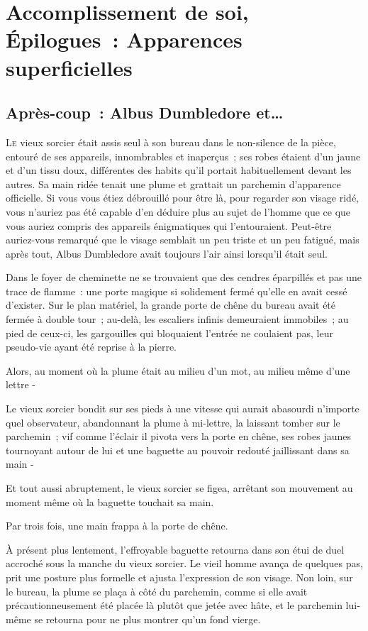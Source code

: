 \chapter{Accomplissement de soi, Épilogues~: Apparences superficielles}

\section{Après-coup~: Albus Dumbledore et…}

\lettrine{L}{e} vieux sorcier était assis seul à son bureau dans le non-silence de la pièce, entouré de ses appareils, innombrables et inaperçus~; ses robes étaient d'un jaune et d'un tissu doux, différentes des habits qu'il portait habituellement devant les autres. Sa main ridée tenait une plume et grattait un parchemin d'apparence officielle. Si vous vous étiez débrouillé pour être là, pour regarder son visage ridé, vous n'auriez pas été capable d'en déduire plus au sujet de l'homme que ce que vous auriez compris des appareils énigmatiques qui l'entouraient. Peut-être auriez-vous remarqué que le visage semblait un peu triste et un peu fatigué, mais après tout, Albus Dumbledore avait toujours l'air ainsi lorsqu'il était seul.

Dans le foyer de cheminette ne se trouvaient que des cendres éparpillés et pas une trace de flamme~: une porte magique si solidement fermé qu'elle en avait cessé d'exister. Sur le plan matériel, la grande porte de chêne du bureau avait été fermée à double tour~; au-delà, les escaliers infinis demeuraient immobiles~; au pied de ceux-ci, les gargouilles qui bloquaient l'entrée ne coulaient pas, leur pseudo-vie ayant été reprise à la pierre.

Alors, au moment où la plume était au milieu d'un mot, au milieu même d'une lettre -

Le vieux sorcier bondit sur ses pieds à une vitesse qui aurait abasourdi n'importe quel observateur, abandonnant la plume à mi-lettre, la laissant tomber sur le parchemin~; vif comme l'éclair il pivota vers la porte en chêne, ses robes jaunes tournoyant autour de lui et une baguette au pouvoir redouté jaillissant dans sa main -

Et tout aussi abruptement, le vieux sorcier se figea, arrêtant son mouvement au moment même où la baguette touchait sa main.

Par trois fois, une main frappa à la porte de chêne.

À présent plus lentement, l'effroyable baguette retourna dans son étui de duel accroché sous la manche du vieux sorcier. Le vieil homme avança de quelques pas, prit une posture plus formelle et ajusta l'expression de son visage. Non loin, sur le bureau, la plume se plaça à côté du parchemin, comme si elle avait précautionneusement été placée là plutôt que jetée avec hâte, et le parchemin lui-même se retourna pour ne plus montrer qu'un fond vierge.


